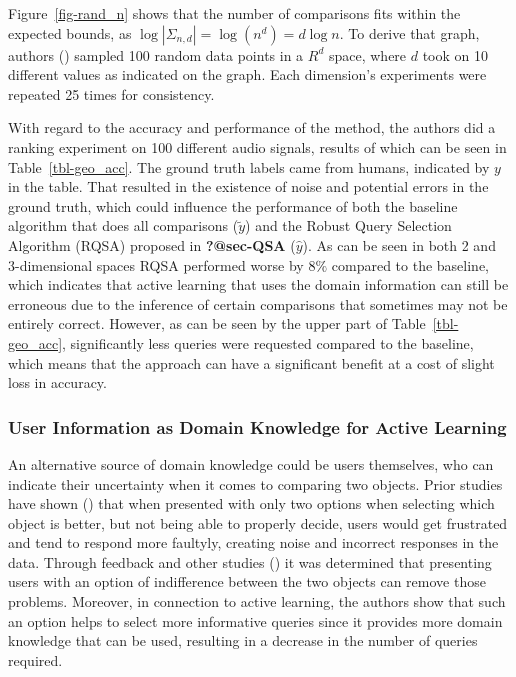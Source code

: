 \documentclass[
  letterpaper,
  numbers=noenddot,
  DIV=11]{scrreprt}
\theoremstyle{definition}
\theoremstyle{plain}
\theoremstyle{plain}
\theoremstyle{remark}
\begin{document}
Figure~\ref{fig-rand_n} shows that the number of comparisons fits within
the expected bounds, as \(\log|\Sigma_{n,d}| = \log(n^d) = d\log n\). To
derive that graph, authors ()
sampled 100 random data points in a \(R^d\) space, where \(d\) took on
10 different values as indicated on the graph. Each dimension's
experiments were repeated 25 times for consistency.

With regard to the accuracy and performance of the method, the authors
did a ranking experiment on 100 different audio signals, results of
which can be seen in Table~\ref{tbl-geo_acc}. The ground truth labels
came from humans, indicated by \(y\) in the table. That resulted in the
existence of noise and potential errors in the ground truth, which could
influence the performance of both the baseline algorithm that does all
comparisons (\(\tilde{y}\)) and the Robust Query Selection Algorithm
(RQSA) proposed in \textbf{?@sec-QSA} (\(\hat{y}\)). As can be seen in
both 2 and 3-dimensional spaces RQSA performed worse by \(8\%\) compared
to the baseline, which indicates that active learning that uses the
domain information can still be erroneous due to the inference of
certain comparisons that sometimes may not be entirely correct. However,
as can be seen by the upper part of Table~\ref{tbl-geo_acc},
significantly less queries were requested compared to the baseline,
which means that the approach can have a significant benefit at a cost
of slight loss in accuracy.

\subsubsection*{User Information as Domain Knowledge for Active
Learning}\label{sec-geo_app}

An alternative source of domain knowledge could be users themselves, who
can indicate their uncertainty when it comes to comparing two objects.
Prior studies have shown () that when presented with only two options when selecting which
object is better, but not being able to properly decide, users would get
frustrated and tend to respond more faultyly, creating noise and
incorrect responses in the data. Through feedback and other studies
() it was
determined that presenting users with an option of indifference between
the two objects can remove those problems. Moreover, in connection to
active learning, the authors show that such an option helps to select
more informative queries since it provides more domain knowledge that
can be used, resulting in a decrease in the number of queries required.
\end{document}
